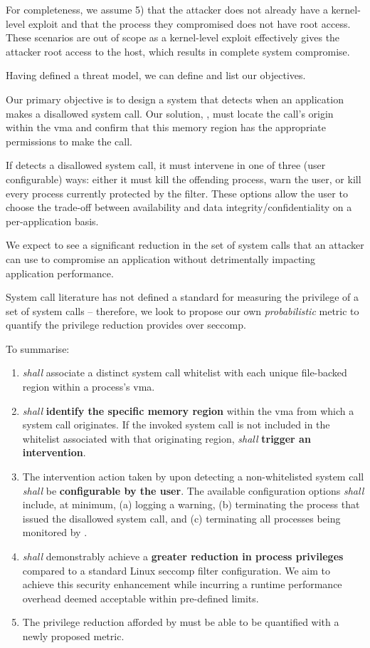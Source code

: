 For completeness, we assume 5) that the attacker does not already have a 
kernel-level exploit and that the process they compromised does not have root
access. These scenarios are out of scope as a kernel-level exploit effectively gives the
attacker root access to the host, which results in complete system compromise.



Having defined a threat model, we can define and list our objectives.

Our primary objective is to design a system that detects when an application
makes a disallowed system call. Our solution, \af,  must locate the call's origin
within the \ac{vma} and confirm that this memory region has the
appropriate permissions to make the call.

If \af detects a disallowed system call, it must intervene in one of three (user
configurable) ways: either it must kill the offending process, warn the user, or
kill every process currently protected by the filter. These options allow the user to
choose the trade-off between availability and data integrity/confidentiality on
a per-application basis.

We expect to see a significant reduction in the set of system calls that an
attacker can use to compromise an application without detrimentally impacting
application performance. 

System call literature has not defined a standard for measuring the privilege
of a set of system calls -- therefore, we look to propose our own
\textit{probabilistic} metric to quantify the privilege reduction \af
provides over seccomp.

To summarise:

\begin{enumerate}
    \item \af \textit{shall} associate a distinct system call whitelist with each unique file-backed region within a process's \ac{vma}.
    \item \af \textit{shall} \textbf{identify the specific memory region} within the \ac{vma} from which a system call originates. If the invoked system call is not included in the whitelist associated with that originating region, \af \textit{shall} \textbf{trigger an intervention}.
    \item The intervention action taken by \af upon detecting a non-whitelisted system call \textit{shall} be \textbf{configurable by the user}. The available configuration options \textit{shall} include, at minimum, (a) logging a warning, (b) terminating the process that issued the disallowed system call, and (c) terminating all processes being monitored by \af.
    \item \af \textit{shall} demonstrably achieve a \textbf{greater reduction in process privileges} compared to a standard Linux seccomp filter configuration. We aim to achieve this security enhancement while incurring a runtime performance overhead deemed acceptable within pre-defined limits.
    \item The privilege reduction afforded by \af must be able to be quantified
        with a newly proposed metric.
\end{enumerate}

